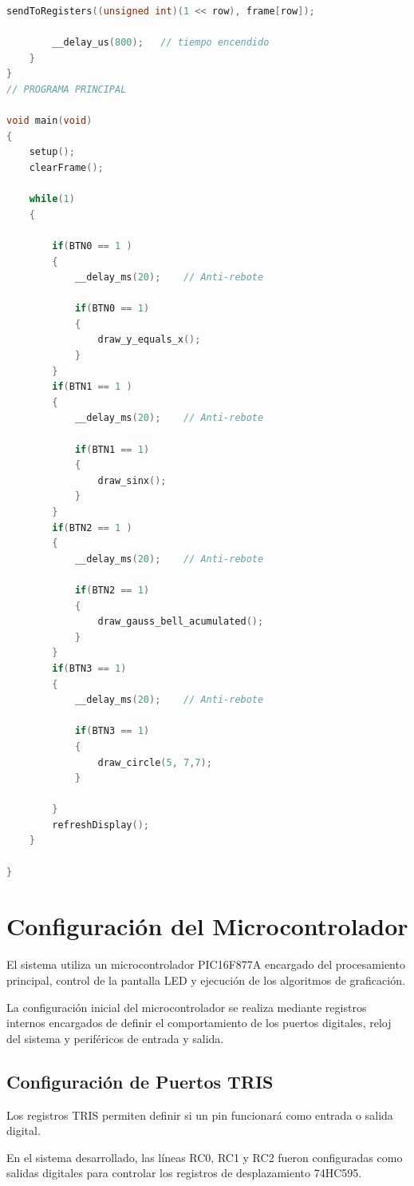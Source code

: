 \begin{lstlisting}[language=C]
        sendToRegisters((unsigned int)(1 << row), frame[row]);

        __delay_us(800);   // tiempo encendido
    }
}
// PROGRAMA PRINCIPAL

void main(void)
{
    setup();
    clearFrame();

    while(1)
    {

        if(BTN0 == 1 )          
        {
            __delay_ms(20);    // Anti-rebote

            if(BTN0 == 1)    
            {
                draw_y_equals_x();
            }
        }
        if(BTN1 == 1 )          
        {
            __delay_ms(20);    // Anti-rebote

            if(BTN1 == 1)    
            {
                draw_sinx();
            }
        }
        if(BTN2 == 1 )          
        {
            __delay_ms(20);    // Anti-rebote

            if(BTN2 == 1)    
            {
                draw_gauss_bell_acumulated();
            }
        }
        if(BTN3 == 1)
        {
            __delay_ms(20);    // Anti-rebote

            if(BTN3 == 1)    
            {
                draw_circle(5, 7,7);
            }
        
        }
        refreshDisplay();
    }

}
\end{lstlisting}
   \section{Configuración del Microcontrolador}

El sistema utiliza un microcontrolador PIC16F877A encargado del procesamiento principal, control de la pantalla LED y ejecución de los algoritmos de graficación.

La configuración inicial del microcontrolador se realiza mediante registros internos encargados de definir el comportamiento de los puertos digitales, reloj del sistema y periféricos de entrada y salida.

\subsection{Configuración de Puertos TRIS}

Los registros TRIS permiten definir si un pin funcionará como entrada o salida digital.

En el sistema desarrollado, las líneas RC0, RC1 y RC2 fueron configuradas como salidas digitales para controlar los registros de desplazamiento 74HC595.

